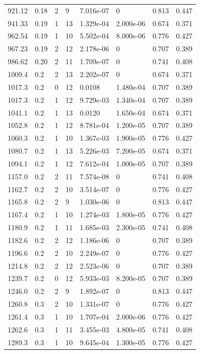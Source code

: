 \documentclass[preview]{standalone}
\begin{document}
{{{\begin{tabular}{L{1.2cm}C{1.2cm} C{0.3cm}C{0.5cm} C{1.4cm}C{1.4cm} C{1.4cm}C{1.4cm}}
  921.12  &  0.18  & 2     &  9 &  7.016e-07  & 0  & 0.813 &  0.447   \\ 
  941.33  &  0.19  & 1     & 13 &  1.329e-04  & 2.000e-06  & 0.674 &  0.371   \\ 
  962.54  &  0.19  & 1     & 10 &  5.502e-04  & 8.000e-06  & 0.776 &  0.427   \\ 
  967.23  &  0.19  & 2     & 12 &  2.178e-06  & 0  & 0.707 &  0.389   \\ 
  986.62  &  0.20  & 2     & 11 &  1.709e-07  & 0  & 0.741 &  0.408   \\ 
  1009.4  &   0.2  & 2     & 13 &  2.202e-07  & 0  & 0.674 &  0.371   \\ 
  1017.3  &   0.2  & 0     & 12 &  0.0108  & 1.480e-04  & 0.707 &  0.389   \\ 
  1017.3  &   0.2  & 1     & 12 &  9.729e-03  & 1.340e-04  & 0.707 &  0.389   \\ 
  1041.1  &   0.2  & 1     & 13 &  0.0120  & 1.650e-04  & 0.674 &  0.371   \\ 
  1052.8  &   0.2  & 1     & 12 &  8.781e-04  & 1.200e-05  & 0.707 &  0.389   \\ 
  1060.3  &   0.2  & 1     & 10 &  1.367e-03  & 1.900e-05  & 0.776 &  0.427   \\ 
  1080.7  &   0.2  & 1     & 13 &  5.226e-03  & 7.200e-05  & 0.674 &  0.371   \\ 
  1094.1  &   0.2  & 1     & 12 &  7.612e-04  & 1.000e-05  & 0.707 &  0.389   \\ 
  1157.0  &   0.2  & 2     & 11 &  7.574e-08  & 0  & 0.741 &  0.408   \\ 
  1162.7  &   0.2  & 2     & 10 &  3.514e-07  & 0  & 0.776 &  0.427   \\ 
  1165.8  &   0.2  & 2     &  9 &  1.030e-06  & 0  & 0.813 &  0.447   \\ 
  1167.4  &   0.2  & 1     & 10 &  1.274e-03  & 1.800e-05  & 0.776 &  0.427   \\ 
  1180.9  &   0.2  & 1     & 11 &  1.685e-03  & 2.300e-05  & 0.741 &  0.408   \\ 
  1182.6  &   0.2  & 2     & 12 &  1.186e-06  & 0  & 0.707 &  0.389   \\ 
  1196.6  &   0.2  & 2     & 10 &  2.249e-07  & 0  & 0.776 &  0.427   \\ 
  1214.8  &   0.2  & 2     & 12 &  2.523e-06  & 0  & 0.707 &  0.389   \\ 
  1239.7  &   0.2  & 0     & 12 &  5.933e-03  & 8.200e-05  & 0.707 &  0.389   \\ 
  1246.0  &   0.2  & 2     &  9 &  1.892e-07  & 0  & 0.813 &  0.447   \\ 
  1260.8  &   0.3  & 2     & 10 &  1.331e-07  & 0  & 0.776 &  0.427   \\ 
  1261.4  &   0.3  & 1     & 10 &  1.707e-04  & 2.000e-06  & 0.776 &  0.427   \\ 
  1262.6  &   0.3  & 1     & 11 &  3.455e-03  & 4.800e-05  & 0.741 &  0.408   \\ 
  1289.3  &   0.3  & 1     & 10 &  9.645e-04  & 1.300e-05  & 0.776 &  0.427   \\ 
\hline 
\end{tabular} 

}}}
\end{document}
